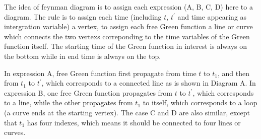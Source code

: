 The idea of feynman diagram is to assign each expression (A, B, C, D) here to a diagram.
The rule is to assign each time (including $t$, $t^{\prime}$ and time appearing as intergration variable) a vertex, to assign each free Green function a line or curve which connects the two vertexs correponding to the time variables of the Green function itself.
The starting time of the Green function in interest is always on the bottom while in end time is always on the top.

In expression A, free Green function first propagate from time $t$ to $t_1$, and then from $t_1$ to $t^{\prime}$, which corresponds to a connected line as is shown in Diagram A.
In expression B, one free Green function propagates from $t$ to $t^{\prime}$, which corresponds to a line, while the other propagates from $t_1$ to itself, which corresponds to a loop (a curve ends at the starting vertex).
The case C and D are also similar, except that $t_1$ has four indexes, which means it should be connected to four lines or curves.

